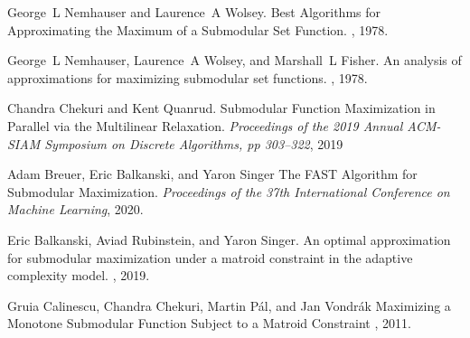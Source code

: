 \documentclass[11pt, a4paper]{article}
\begin{document}
\begin{thebibliography}{99}
    George~L Nemhauser and Laurence~A Wolsey.
	\newblock Best Algorithms for Approximating the Maximum of a Submodular Set Function.
	, 1978.
	
    George~L Nemhauser, Laurence~A Wolsey, and Marshall~L Fisher.
    \newblock An analysis of approximations for maximizing submodular set functions.
    , 1978.

     Chandra Chekuri and Kent Quanrud.
	\newblock Submodular Function Maximization in Parallel via the Multilinear Relaxation.
	\newblock \emph{Proceedings of the 2019 Annual ACM-SIAM Symposium on Discrete Algorithms, pp 303--322}, 2019

     Adam Breuer, Eric Balkanski, and Yaron Singer
	\newblock The FAST Algorithm for Submodular Maximization.
	\newblock \emph{Proceedings of the 37th International Conference on Machine Learning}, 2020.
	
	 Eric Balkanski, Aviad Rubinstein, and Yaron Singer.
	\newblock An optimal approximation for submodular maximization under a matroid constraint in the adaptive complexity model.
	, 2019.
	
	 Gruia Calinescu, Chandra Chekuri, Martin Pál, and Jan Vondrák
	\newblock Maximizing a Monotone Submodular Function Subject to a Matroid Constraint
	, 2011.
	

\end{thebibliography}
\end{document}
